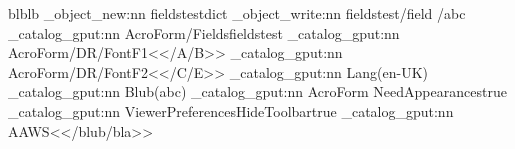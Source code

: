 \documentclass{article}
\begin{document}
\ExplSyntaxOn

blblb
\pdf_object_new:nn   {fieldstest}{dict}
\pdf_object_write:nn {fieldstest}{/field /abc}
\pdf_catalog_gput:nn {AcroForm/Fields}{fieldstest}
\pdf_catalog_gput:nn {AcroForm/DR/Font}{{F1}{<</A/B>>}}
\pdf_catalog_gput:nn {AcroForm/DR/Font}{{F2}{<</C/E>>}}
\pdf_catalog_gput:nn {Lang}{(en-UK)}
\pdf_catalog_gput:nn {Blub}{(abc)}
\pdf_catalog_gput:nn {AcroForm} {{NeedAppearances}{true}}
\pdf_catalog_gput:nn {ViewerPreferences}{{HideToolbar}{true}}
\pdf_catalog_gput:nn {AA}{{WS}{<</blub/bla>>}}

\ExplSyntaxOff
\end{document}
